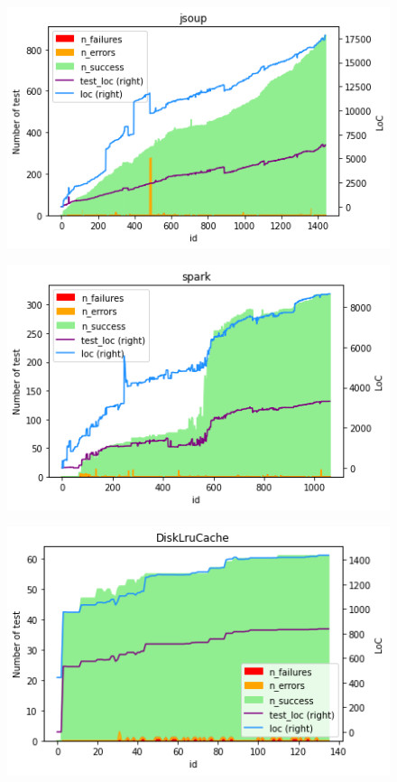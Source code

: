 \begin{figure}[!htb]
    \centering
    \begin{minipage}{.5\textwidth}
        \centering
        \includegraphics[width=\textwidth]{pages/02-Testability/images/projects/jsoup.png}
        \label{fig:jsoup}
    \end{minipage}%
    \begin{minipage}{.5\textwidth}
        \centering
        \includegraphics[width=\textwidth]{pages/02-Testability/images/projects/spark.png}
        \label{fig:spark}
    \end{minipage}
    \begin{minipage}{.5\textwidth}
        \centering
        \includegraphics[width=\textwidth]{pages/02-Testability/images/projects/disklrucache.png}

\end{minipage}
\end{figure}
